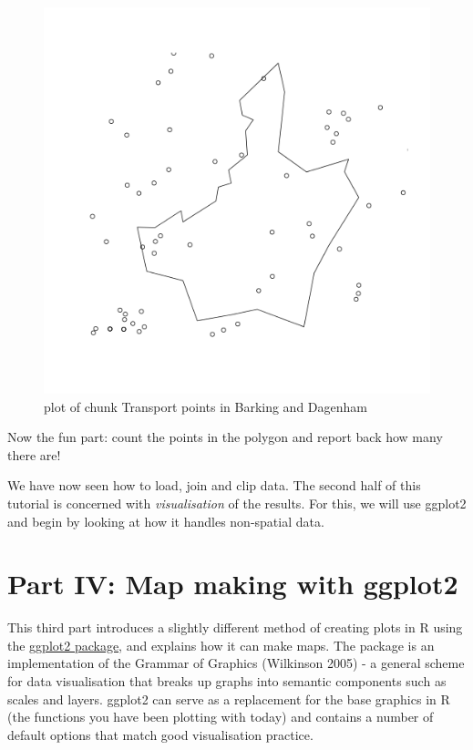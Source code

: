 \documentclass[]{article}
\begin{document}
\begin{figure}[htbp]
\centering
\includegraphics{figure/Transport_points_in_Barking_and_Dagenham.png}
\caption{plot of chunk Transport points in Barking and Dagenham}
\end{figure}

Now the fun part: count the points in the polygon and report back how
many there are!

We have now seen how to load, join and clip data. The second half of
this tutorial is concerned with \emph{visualisation} of the results. For
this, we will use ggplot2 and begin by looking at how it handles
non-spatial data.

\section{Part IV: Map making with
ggplot2}\label{part-iv-map-making-with-ggplot2}

This third part introduces a slightly different method of creating plots
in R using the \href{http://ggplot2.org/}{ggplot2 package}, and explains
how it can make maps. The package is an implementation of the Grammar of
Graphics (Wilkinson 2005) - a general scheme for data visualisation that
breaks up graphs into semantic components such as scales and layers.
ggplot2 can serve as a replacement for the base graphics in R (the
functions you have been plotting with today) and contains a number of
default options that match good visualisation practice.
\end{document}
